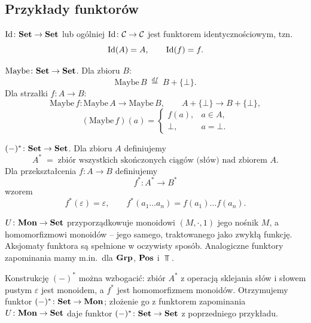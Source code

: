 \subsection{Przykłady funktorów}

\begin{przyklad}
$\mathrm{Id} \colon \mathbf{Set} \to \mathbf{Set}$ lub ogólniej $\mathrm{Id} \colon \mathcal{C} \to \mathcal{C}$ jest funktorem identycznościowym, tzn.
\[
\mathrm{Id}(A) = A, \qquad \mathrm{Id}(f) = f.
\]
\end{przyklad}

\begin{przyklad}
$\mathrm{Maybe} \colon \mathbf{Set} \to \mathbf{Set}$. Dla zbioru $B$:
\[
\mathrm{Maybe}\, B \;\stackrel{df}{=}\; B + \{\bot\}.
\]
Dla strzałki $f \colon A \to B$:
\[
\mathrm{Maybe}\, f \colon \mathrm{Maybe}\, A \longrightarrow \mathrm{Maybe}\, B, \qquad
A + \{\bot\} \longrightarrow B + \{\bot\},
\]
\[
(\mathrm{Maybe}\, f)(a) = \begin{cases} f(a), & a \in A, \\ \bot, & a = \bot. \end{cases}
\]
\end{przyklad}

\begin{przyklad}
$(-)^{*} \colon \mathbf{Set} \to \mathbf{Set}$. Dla zbioru $A$ definiujemy
\[
A^{*} \;=\; \text{zbiór wszystkich skończonych ciągów (słów) nad zbiorem } A.
\]
Dla przekształcenia $f \colon A \to B$ definiujemy
\[
f^{*} \colon A^{*} \longrightarrow B^{*}
\]
wzorem
\[
f^{*}(\varepsilon) = \varepsilon, \qquad f^{*}(a_1 \ldots a_n) = f(a_1) \ldots f(a_n).
\]
\end{przyklad}

\begin{przyklad}
$U \colon \mathbf{Mon} \to \mathbf{Set}$ przyporządkowuje monoidowi $(M, \cdot, 1)$ jego nośnik $M$, a homomorfizmowi monoidów -- jego samego, traktowanego jako zwykłą funkcję. Aksjomaty funktora są spełnione w oczywisty sposób. Analogiczne funktory zapominania mamy m.in.\ dla $\mathbf{Grp}$, $\mathbf{Pos}$ i $\Top$.
\end{przyklad}

\begin{przyklad}
Konstrukcję $(-)^{*}$ można wzbogacić: zbiór $A^{*}$ z operacją sklejania słów i słowem pustym $\varepsilon$ jest monoidem, a $f^{*}$ jest homomorfizmem monoidów. Otrzymujemy funktor $(-)^{*} \colon \mathbf{Set} \to \mathbf{Mon}$; złożenie go z funktorem zapominania $U \colon \mathbf{Mon} \to \mathbf{Set}$ daje funktor $(-)^{*} \colon \mathbf{Set} \to \mathbf{Set}$ z poprzedniego przykładu.
\end{przyklad}

